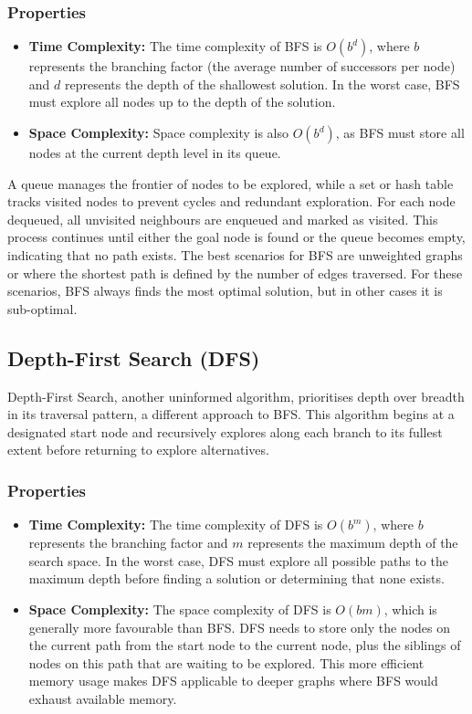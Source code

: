 \subsubsection{Properties}
\begin{itemize}
    \item \textbf{Time Complexity:} The time complexity of BFS is $O(b^d)$, where $b$ represents the branching factor (the average number of successors per node) and $d$ represents the depth of the shallowest solution. In the worst case, BFS must explore all nodes up to the depth of the solution.
    
    \item \textbf{Space Complexity:} Space complexity is also $O(b^d)$, as BFS must store all nodes at the current depth level in its queue.
\end{itemize}

A queue manages the frontier of nodes to be explored, while a set or hash table tracks visited nodes to prevent cycles and redundant exploration. For each node dequeued, all unvisited neighbours are enqueued and marked as visited. This process continues until either the goal node is found or the queue becomes empty, indicating that no path exists. The best scenarios for BFS are unweighted graphs or where the shortest path is defined by the number of edges traversed. For these scenarios, BFS always finds the most optimal solution, but in other cases it is sub-optimal.

\subsection{Depth-First Search (DFS) \cite{geeksforgeeks_2019_depth}}
Depth-First Search, another uninformed algorithm, prioritises depth over breadth in its traversal pattern, a different approach to BFS. This algorithm begins at a designated start node and recursively explores along each branch to its fullest extent before returning to explore alternatives.

\subsubsection{Properties}
\begin{itemize}
    
    \item \textbf{Time Complexity:} The time complexity of DFS is $O(b^m)$, where $b$ represents the branching factor and $m$ represents the maximum depth of the search space. In the worst case, DFS must explore all possible paths to the maximum depth before finding a solution or determining that none exists.
    
    \item \textbf{Space Complexity:} The space complexity of DFS is $O(bm)$, which is generally more favourable than BFS. DFS needs to store only the nodes on the current path from the start node to the current node, plus the siblings of nodes on this path that are waiting to be explored. This more efficient memory usage makes DFS applicable to deeper graphs where BFS would exhaust available memory.
\end{itemize}

